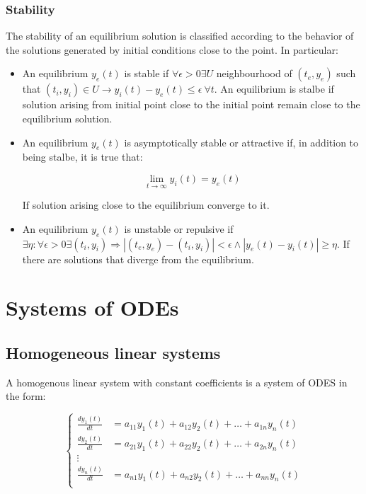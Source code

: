     \subsubsection{Stability}
    The stability of an equilibrium solution is classified according to the behavior of the solutions generated by initial conditions close to the point.
    In particular:

    \begin{multicols}{2}
      \begin{itemize}
        \item An equilibrium $y_e(t)$ is stable if $\forall\epsilon>0\exists U$ neighbourhood of $(t_e, y_e)$ such that $(t_i,y_i)\in U\rightarrow y_i(t)-y_e(t)\le\epsilon\ \forall t$.
          An equilibrium is stalbe if solution arising from initial point close to the initial point remain close to the equilibrium solution.
        \item An equilibrium $y_e(t)$ is asymptotically stable or attractive if, in addition to being stalbe, it is true that:

          $$\lim\limits_{t\rightarrow\infty}y_i(t) = y_e(t)$$

          If solution arising close to the equilibrium converge to it.
        \item An equilibrium $y_e(t)$ is unstable or repulsive if $\exists\eta:\forall \epsilon>0\exists (t_i, y_i)\Rightarrow |(t_e, y_e)-(t_i,y_i)| < \epsilon\land |y_e(t)-y_i(t)|\ge\eta$.
          If there are solutions that diverge from the equilibrium.
      \end{itemize}
    \end{multicols}

\section{Systems of ODEs}

  \subsection{Homogeneous linear systems}
  A homogenous linear system with constant coefficients is a system of ODES in the form:


  $$\begin{cases}
    \frac{dy_1(t)}{dt} &= a_{11}y_1(t) + a_{12}y_2(t) + \dots + a_{1n}y_n(t)\\
    \frac{dy_2(t)}{dt} &= a_{21}y_1(t) + a_{22}y_2(t) + \dots + a_{2n}y_n(t)\\
    \vdots\\
    \frac{dy_n(t)}{dt} &= a_{n1}y_1(t) + a_{n2}y_2(t) + \dots + a_{nn}y_n(t)\\
  \end{cases}$$

